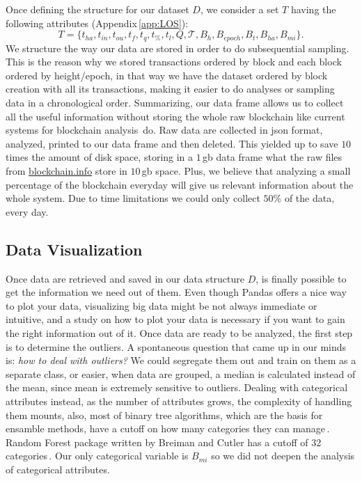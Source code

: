 \documentclass[USenglish]{uit-thesis}
\begin{document}
Once defining the structure for our dataset $D$,
we consider a set $T$ having the following
attributes (Appendix\,\ref{app:LOS}):
\[
T = \{ t_{ha}, t_{in}, t_{ou}, t_f, t_q, t_\%, t_l, Q, \mathcal{T}, B_h, B_{epoch}, B_t, B_{ha}, B_{mi} \}.
\]
We structure the way our data are stored in order to do
subsequential sampling.
This is the reason why we stored transactions
ordered by block and each block ordered by height/epoch,
in that way we have the dataset ordered by block creation
with all its transactions, making it easier to do analyses
or sampling data in a chronological order.
Summarizing, our data frame allows us to collect all
the useful information without storing the whole raw
blockchain like current systems for
blockchain analysis\,\cite{bitcoincore} do.
Raw data are
collected in \gls{json} format, analyzed, printed to our data frame
and then deleted. This yielded up to save $10$ times the
amount of disk space,
storing in a $1$\,\gls{gb} data frame what the raw files
from \url{blockchain.info} store in $10$\,\gls{gb} space. Plus, we
believe that analyzing a small percentage of the blockchain
everyday will give us relevant information about the
whole system. Due to time limitations we could only collect $50$\%
of the data, every day.

\subsection{Data Visualization}
\label{sec:datavisualization}
Once data are retrieved and saved in our data structure $D$,
is finally possible to get the information we need out of them.
Even though Pandas offers a nice way to plot your data, 
visualizing big data might be not always immediate or intuitive,
and a study on how to plot your data is necessary if you want
to gain the right information out of it.
Once data are ready to be analyzed, the first
step is to determine the outliers.
A spontaneous question that came up in our minds is:
\emph{how to deal with outliers?} We could segregate them
out and train on them as a separate class, or easier, when
data are grouped, a median is calculated instead of the mean,
since mean is extremely sensitive to outliers.
Dealing with categorical attributes instead, as the number
of attributes grows,
the complexity of handling them mounts,
also, most of binary tree algorithms, which are the basis for
ensamble methods, have a cutoff on how many
categories they can manage\,\cite{bowles2015machine}.
Random Forest package written by Breiman and Cutler
has a cutoff of 32 categories\,\cite{Breiman:2001:RF}.
Our only categorical variable is $B_{mi}$ so we
did not deepen the analysis of categorical attributes.
\end{document}
